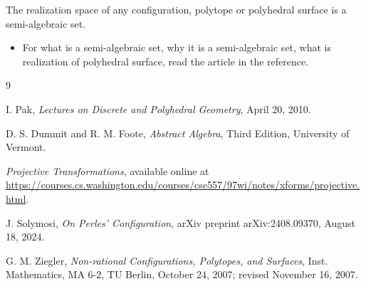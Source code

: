 \documentclass{article}
\newenvironment{theorem*}
 {\expandafter\def\expandafter\thetheorem\expandafter{\thetheorem*}\theorem}
 {\endtheorem}
\begin{document}
\begin{theorem*}[Grunbaum]
    The realization space of any configuration, polytope or polyhedral surface is a semi-algebraic set.
\end{theorem*}

\begin{itemize}
    \item For what is a semi-algebraic set, why it is a semi-algebraic set, what is realization of polyhedral surface, read the article in the reference.\cite{ziegler2007}
\end{itemize}

\begin{thebibliography}{9}

    I. Pak, 
    \textit{Lectures on Discrete and Polyhedral Geometry}, 
    April 20, 2010.
    
    D. S. Dummit and R. M. Foote, 
    \textit{Abstract Algebra}, 
    Third Edition, 
    University of Vermont.
    
    \textit{Projective Transformations}, 
    available online at \url{https://courses.cs.washington.edu/courses/cse557/97wi/notes/xforms/projective.html}.
    
    J. Solymosi, 
    \textit{On Perles' Configuration}, 
    arXiv preprint arXiv:2408.09370, August 18, 2024.
    
    G. M. Ziegler, 
    \textit{Non-rational Configurations, Polytopes, and Surfaces}, 
    Inst. Mathematics, MA 6-2, TU Berlin, October 24, 2007; revised November 16, 2007.
    
    \end{thebibliography}
    
\end{document}
